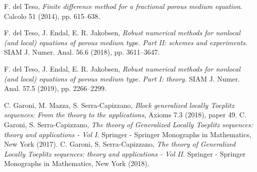 \documentclass{amsart}
\begin{document}
\begin{thebibliography}{}
%

 F. del Teso, {\itshape Finite difference method for a fractional porous medium equation}. Calcolo 51 (2014), pp. 615–638.

 F. del Teso, J. Endal, E. R. Jakobsen, {\itshape Robust numerical methods for nonlocal (and local) equations of porous medium type. Part II: schemes and experiments}. SIAM J. Numer. Anal. 56.6 (2018), pp. 3611–3647.

 F. del Teso, J. Endal, E. R. Jakobsen, {\itshape Robust numerical methods for nonlocal (and local) equations of porous medium type. Part I: theory}. SIAM J. Numer. Anal. 57.5 (2019), pp. 2266–2299.

 C. Garoni, M. Mazza, S. Serra-Capizzano, {\it Block generalized locally Toeplitz sequences: From the theory to the applications}, Axioms 7.3 (2018), paper 49.
%
 C. Garoni, S. Serra-Capizzano, {\itshape The theory of Generalized Locally Toeplitz sequences: theory and applications - Vol I.}  Springer - Springer Monographs in Mathematics, New York (2017).
%
 C. Garoni, S. Serra-Capizzano, {\itshape The theory of Generalized Locally Toeplitz sequences:  theory and applications - Vol II.}  Springer - Springer Monographs in Mathematics, New York (2018).
%
%
%



%
%
%
%


\end{thebibliography}
\end{document}
